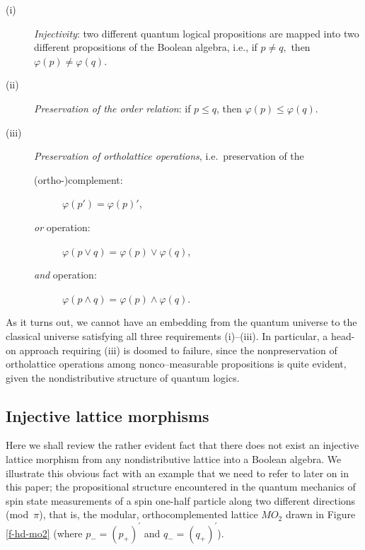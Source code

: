 \begin{description}

\item[{\rm (i)}]
{\em Injectivity}:
two different quantum logical propositions are mapped into two
different propositions of the Boolean algebra, i.e., if $p\neq
q, $ then $ \varphi (p)\neq \varphi (q)$.

\item[{\rm (ii)}]
{\em Preservation of the order relation}:
if $p\leq q$,  then $\varphi (p) \leq \varphi (q)$.

\item[{\rm (iii)}]
{\em Preservation of ortholattice operations}, i.e.\ preservation of the
\begin{description}
\item[{\rm (ortho-)complement}:]
$\varphi(p')=\varphi (p)'$,
\item[{\it or} {\rm operation}:] $\varphi (p\vee q)=\varphi (p)
\vee \varphi (q)$,
\item[{\it and} {\rm operation}:] $\varphi (p\wedge q)=\varphi (p)
\wedge \varphi (q)$.
\end{description}
\end{description}

As it turns out,  we cannot have an embedding from the quantum universe
to the classical universe satisfying all three requirements (i)--(iii).
In particular, a head-on approach requiring (iii) is doomed to failure,
since the nonpreservation of ortholattice operations
among nonco--measurable propositions is quite evident, given the
nondistributive structure of quantum logics.

\subsection{Injective lattice morphisms}

Here we shall review the rather evident fact that there does not
exist an injective lattice
morphism from any nondistributive lattice into a Boolean algebra.
We illustrate this obvious fact with an example that we need to
refer to later on in this paper;
the propositional structure encountered in the
quantum mechanics of spin state measurements of a spin one-half particle
along two different directions (mod~$\pi$), that is, the modular,
orthocomplemented lattice $MO_2$ drawn in Figure \ref{f-hd-mo2}
(where $p_-=(p_+)^\prime$ and $q_-=(q_+)^\prime$).

